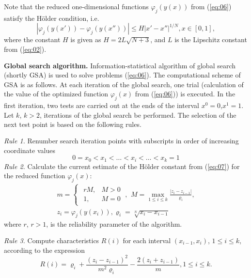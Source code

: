 \documentclass[runningheads]{llncs}
\begin{document}
Note that the reduced one-dimensional functions $\varphi_j (y(x))$ from (\ref{eq:06}) satisfy the H{\" o}lder condition, i.e.
\begin{equation}
\label{eq:07}
|\varphi_j(y(x')) - \varphi_j(y(x''))| \leq H |x' - x''|^{1/N} , x \in [0,1],
\end{equation}
where the constant $H$ is given as $H=2L\sqrt{N+3}$, and $L$ is the Lipschitz constant from (\ref{eq:02}).

\textbf{Global search algorithm.} Information-statistical algorithm of global search (shortly GSA) \cite{Konnov2025,Gergel2019_2,Gergel2018,GergelKozinov2020,Strongin2000,Sergeyev2013} is used to solve problems (\ref{eq:06}). The computational scheme of GSA is as follows. At each iteration of the global search, one trial (calculation of the value of the optimized function $\varphi_j (x)$ from (\ref{eq:06})) is executed. In the first iteration, two tests are carried out at the ends of the interval $x^0=0$,$x^1=1$. Let $k$, $k>2$, iterations of the global search be performed. The selection of the next test point is based on the following rules.

\textit{Rule 1.} Renumber search iteration points with subscripts in order of increasing coordinate values
\begin{equation}
    \label{eq:08}
    0 = x_0 < x_1 < \dots < x_i < \dots < x_{k} = 1
\end{equation}
\textit{Rule 2.} Calculate the current estimate of the H{\" o}lder constant from (\ref{eq:07}) for the reduced function $\varphi_j (x)$:
\begin{equation}
    \label{eq:9}
		\begin{matrix}
		m=\begin{cases}
				\begin{matrix}
					 r M, & M >0 \\
					 1, & M = 0 
				\end{matrix} \; , 
			\end{cases}
		M = \max_{1 \leq i \leq k} \frac{| z_i - z_{i-1}|}{\varrho_i}, \\
		z_i = \varphi_j( y(x_i) ), \varrho_i=\sqrt[N]{x_i-x_{i-1}}
		\end{matrix}
\end{equation}
where $r$, $r>1$, is the reliability parameter of the algorithm. 

\textit{Rule 3.} Compute characteristics $R(i)$ for each interval $(x_{i-1}, x_i)$, $1\leq i \leq k$, according to the expression
\begin{equation}
    \label{eq:10}
    R(i) = \varrho_i + \frac{(z_i-z_{i-1})^2}{m^2 \varrho_i} - \frac{2 (z_i+z_{i-1})}{m}, 1 \leq i \leq k.
\end{equation}
\end{document}
